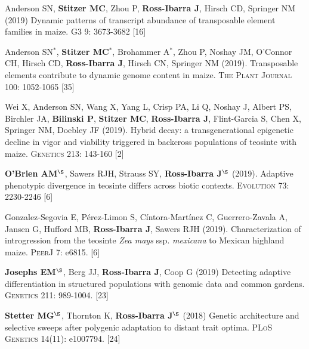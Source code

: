 \documentclass[letterpaper,10pt]{article}
\begin{document}
\begin{etaremune}
\item  Anderson SN, \textbf{Stitzer MC},  Zhou P, \textbf{Ross-Ibarra J}, Hirsch CD, Springer NM (2019) Dynamic patterns of transcript abundance of transposable element families in maize. \textsc{G3} 9: 3673-3682
 [16]\\

\item  Anderson SN$^*$, \textbf{Stitzer MC}$^*$,  Brohammer A$^*$, Zhou P, Noshay JM,  O'Connor CH, Hirsch CD, \textbf{Ross-Ibarra J}, Hirsch CN, Springer NM (2019). Transposable elements contribute to dynamic genome content in maize. \textsc{The Plant Journal} 100: 1052-1065
 [35]\\

\item Wei X,  Anderson SN,  Wang X,  Yang L, Crisp PA,  Li Q,  Noshay J, Albert PS, Birchler JA,  \textbf{Bilinski P}, \textbf{Stitzer MC}, \textbf{Ross-Ibarra J},  Flint-Garcia S,  Chen X,  Springer NM, Doebley JF (2019). Hybrid decay: a transgenerational epigenetic decline in vigor and viability triggered in backcross populations of teosinte with maize. \textsc{Genetics} 213: 143-160
 [2]\\

\item \textbf{O'Brien AM}$^\S$, Sawers RJH, Strauss SY, \textbf{Ross-Ibarra J}$^\S$ (2019). Adaptive phenotypic divergence in teosinte differs across biotic contexts. \textsc{Evolution} 73: 2230-2246
 [6]\\

\item  Gonzalez-Segovia E,  P\'erez-Limon S,  C\'intora-Mart\'inez C,  Guerrero-Zavala A,  Jansen G,  Hufford MB, \textbf{Ross-Ibarra J}, Sawers RJH (2019). Characterization of introgression from the teosinte \textit{Zea mays} ssp. \textit{mexicana} to Mexican highland maize. \textsc{PeerJ} 7: e6815. %
 [6]\\

\item \textbf{Josephs EM}$^\S$, Berg JJ, \textbf{Ross-Ibarra J}, Coop G (2019) Detecting adaptive differentiation in structured populations with genomic data and common gardens. \textsc{Genetics} 211: 989-1004.
 [23]\\

\item \textbf{Stetter MG}$^\S$, Thornton K, \textbf{Ross-Ibarra J}$^\S$ (2018) Genetic architecture and selective sweeps after polygenic adaptation to distant trait optima. \textsc{PLoS Genetics} 14(11): e1007794. %
 [24]\\


\end{etaremune}
\end{document}
